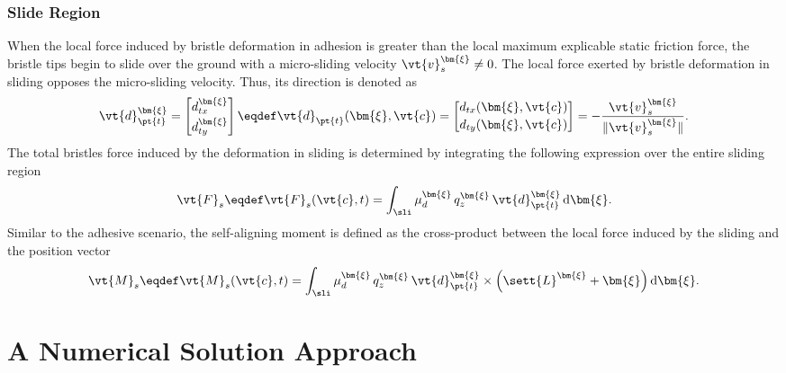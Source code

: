 \subsubsection{Slide Region}

When the local force induced by bristle deformation in adhesion is greater than the local maximum explicable static friction force, the bristle tips begin to slide over the ground with a micro-sliding velocity $\vt{v}_s^{\bm{\xi}} \neq 0$. The local force exerted by bristle deformation in sliding opposes the micro-sliding velocity. Thus, its direction is denoted as
%
\begin{equation}
  \vt{d}_{\pt{t}}^{\bm{\xi}} =
  \begin{bmatrix}
    d_{tx}^{\bm{\xi}} \\[0.2em]
    d_{ty}^{\bm{\xi}}
  \end{bmatrix}
  \eqdef \vt{d}_{\pt{t}}(\bm{\xi},\vt{c}) =
  \begin{bmatrix}
    d_{tx}(\bm{\xi},\vt{c}) \\[0.2em]
    d_{ty}(\bm{\xi},\vt{c})
  \end{bmatrix} =
  -\dfrac{\vt{v}_s^{\bm{\xi}}}{\|{\vt{v}_s^{\bm{\xi}}}\|}.
\end{equation}
%
The total bristles force induced by the deformation in sliding is determined by integrating the following expression over the entire sliding region \sli{}
%
\begin{equation}
  \vt{F}_s \eqdef \vt{F}_s(\vt{c},t) = \int_{\sli} \mu_d^{\bm{\xi}}\,q_z^{\bm{\xi}}\,\vt{d}_{\pt{t}}^{\bm{\xi}} \, \mathrm{d}\bm{\xi}.
  \label{app3:eq:F_s}
\end{equation}
%
Similar to the adhesive scenario, the self-aligning moment is defined as the cross-product between the local force induced by the sliding and the position vector
%
\begin{equation}
  \vt{M}_s \eqdef \vt{M}_s(\vt{c},t) = \int_{\sli} \mu_d^{\bm{\xi}}\,q_z^{\bm{\xi}}\,\vt{d}_{\pt{t}}^{\bm{\xi}} \times \left(\sett{L}^{\bm{\xi}} + \bm{\xi}\right) \mathrm{d}\bm{\xi}.
  \label{app3:eq:M_s}
\end{equation}


\section{A Numerical Solution Approach}
\label{app3:sec:numerical_solution}

